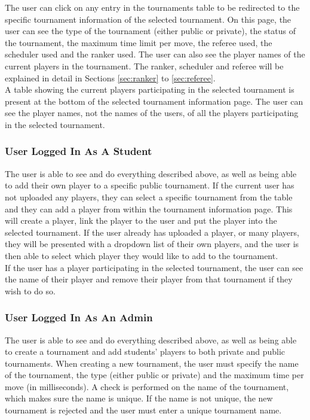 \documentclass[a4paper, 11pt]{report}
\begin{document}
The user can click on any entry in the tournaments table to be redirected to
the specific tournament information of the selected tournament. On this page, the
user can see the type of the tournament (either public or private), the status
of the tournament, the maximum time limit per move, the referee used, the scheduler
used and the ranker used. The user can also see the player names of the current
players in the tournament. The ranker, scheduler and referee will be explained
in detail in Sections \ref{sec:ranker} to \ref{sec:referee}. \\

A table showing the current players participating in the selected tournament is
present at the bottom of the selected tournament information page. The user can
see the player names, not the names of the users, of all the players participating
in the selected tournament.

\subsubsection*{User Logged In As A Student}

The user is able to see and do everything described above, as well as being able
to add their own player to a specific public tournament. If the current user has not
uploaded any players, they can select a specific tournament from the table and
they can add a player from within the tournament information page. This will create
a player, link the player to the user and put the player into the selected
tournament. If the user already has uploaded a player, or many players, they will
be presented with a dropdown list of their own players, and the user is then able
to select which player they would like to add to the tournament. \\

If the user has a player participating in the selected tournament, the user can
see the name of their player and remove their player from that tournament if
they wish to do so.

\subsubsection*{User Logged In As An Admin}

The user is able to see and do everything described above, as well as being able
to create a tournament and add students' players to both private and public
tournaments. When creating a new tournament, the user must specify the name of
the tournament, the type (either public or private) and the maximum time per move
(in milliseconds). A check is performed on the name of the tournament, which makes
sure the name is unique. If the name is not unique, the new tournament is rejected
and the user must enter a unique tournament name. \\
\end{document}
